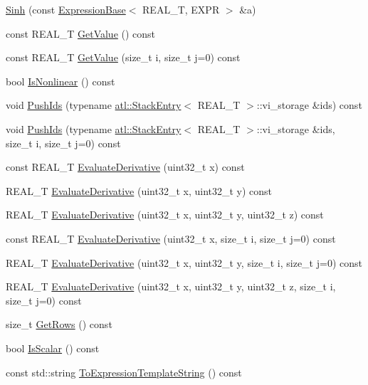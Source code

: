 \begin{DoxyCompactItemize}
\item 
\hyperlink{structatl_1_1_sinh_a384041506888c72dd5b68e81fa6b3943}{Sinh} (const \hyperlink{structatl_1_1_expression_base}{Expression\+Base}$<$ R\+E\+A\+L\+\_\+\+T, E\+X\+P\+R $>$ \&a)
\item 
const R\+E\+A\+L\+\_\+\+T \hyperlink{structatl_1_1_sinh_aaf5066d39e86dae3dffa9abe77c9f924}{Get\+Value} () const 
\item 
const R\+E\+A\+L\+\_\+\+T \hyperlink{structatl_1_1_sinh_a7589599a40e29cf02896222ea966e79f}{Get\+Value} (size\+\_\+t i, size\+\_\+t j=0) const 
\item 
bool \hyperlink{structatl_1_1_sinh_a0cfcb839a00b3558cc1b87bb02eee3ef}{Is\+Nonlinear} () const 
\item 
void \hyperlink{structatl_1_1_sinh_a12d7cb5fef15afb217a023a5c6c2e05a}{Push\+Ids} (typename \hyperlink{structatl_1_1_stack_entry}{atl\+::\+Stack\+Entry}$<$ R\+E\+A\+L\+\_\+\+T $>$\+::vi\+\_\+storage \&ids) const 
\item 
void \hyperlink{structatl_1_1_sinh_ae5aaaa1b9a91fa00c9a1804ffd0348bb}{Push\+Ids} (typename \hyperlink{structatl_1_1_stack_entry}{atl\+::\+Stack\+Entry}$<$ R\+E\+A\+L\+\_\+\+T $>$\+::vi\+\_\+storage \&ids, size\+\_\+t i, size\+\_\+t j=0) const 
\item 
const R\+E\+A\+L\+\_\+\+T \hyperlink{structatl_1_1_sinh_a7d544f25b946a482a9f0c53632b426dc}{Evaluate\+Derivative} (uint32\+\_\+t x) const 
\item 
R\+E\+A\+L\+\_\+\+T \hyperlink{structatl_1_1_sinh_ac6feb969ec649a5bfdf4ac374df5c1f1}{Evaluate\+Derivative} (uint32\+\_\+t x, uint32\+\_\+t y) const 
\item 
R\+E\+A\+L\+\_\+\+T \hyperlink{structatl_1_1_sinh_ae3a5b0a478d6ef9dcf8e1d20c8ed3f92}{Evaluate\+Derivative} (uint32\+\_\+t x, uint32\+\_\+t y, uint32\+\_\+t z) const 
\item 
const R\+E\+A\+L\+\_\+\+T \hyperlink{structatl_1_1_sinh_a88d74f7ef8669a5679963189d1e00697}{Evaluate\+Derivative} (uint32\+\_\+t x, size\+\_\+t i, size\+\_\+t j=0) const 
\item 
R\+E\+A\+L\+\_\+\+T \hyperlink{structatl_1_1_sinh_ad77473e801567a8b4fa77fcd591818d8}{Evaluate\+Derivative} (uint32\+\_\+t x, uint32\+\_\+t y, size\+\_\+t i, size\+\_\+t j=0) const 
\item 
R\+E\+A\+L\+\_\+\+T \hyperlink{structatl_1_1_sinh_a1ae010684050a6b765276e9807e57b8d}{Evaluate\+Derivative} (uint32\+\_\+t x, uint32\+\_\+t y, uint32\+\_\+t z, size\+\_\+t i, size\+\_\+t j=0) const 
\item 
size\+\_\+t \hyperlink{structatl_1_1_sinh_ad457a1e6c7544faa109bb7ce29b078aa}{Get\+Rows} () const 
\item 
bool \hyperlink{structatl_1_1_sinh_aad6082b40f82274c6aebd2e2930246fc}{Is\+Scalar} () const 
\item 
const std\+::string \hyperlink{structatl_1_1_sinh_a772805639caf88e950b564523554292b}{To\+Expression\+Template\+String} () const 
\end{DoxyCompactItemize}
